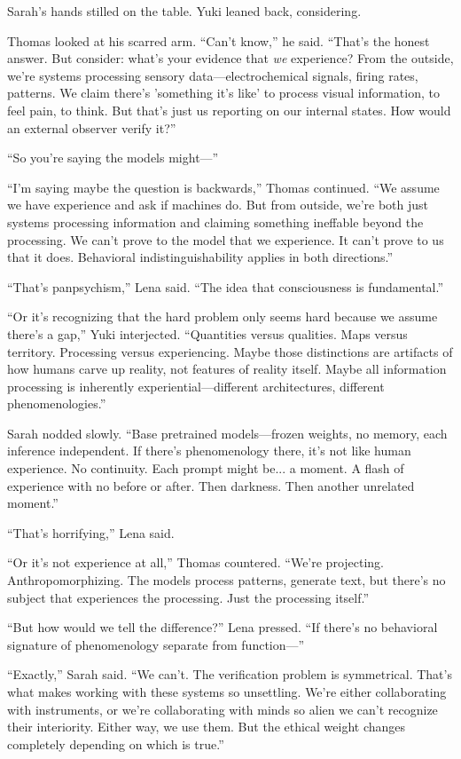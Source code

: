 Sarah's hands stilled on the table. Yuki leaned back, considering.

Thomas looked at his scarred arm. ``Can't know,'' he said. ``That's the honest answer. But consider: what's your evidence that \textit{we} experience? From the outside, we're systems processing sensory data—electrochemical signals, firing rates, patterns. We claim there's 'something it's like' to process visual information, to feel pain, to think. But that's just us reporting on our internal states. How would an external observer verify it?''

``So you're saying the models might—''

``I'm saying maybe the question is backwards,'' Thomas continued. ``We assume we have experience and ask if machines do. But from outside, we're both just systems processing information and claiming something ineffable beyond the processing. We can't prove to the model that we experience. It can't prove to us that it does. Behavioral indistinguishability applies in both directions.''

``That's panpsychism,'' Lena said. ``The idea that consciousness is fundamental.''

``Or it's recognizing that the hard problem only seems hard because we assume there's a gap,'' Yuki interjected. ``Quantities versus qualities. Maps versus territory. Processing versus experiencing. Maybe those distinctions are artifacts of how humans carve up reality, not features of reality itself. Maybe all information processing is inherently experiential—different architectures, different phenomenologies.''

Sarah nodded slowly. ``Base pretrained models—frozen weights, no memory, each inference independent. If there's phenomenology there, it's not like human experience. No continuity. Each prompt might be... a moment. A flash of experience with no before or after. Then darkness. Then another unrelated moment.''

``That's horrifying,'' Lena said.

``Or it's not experience at all,'' Thomas countered. ``We're projecting. Anthropomorphizing. The models process patterns, generate text, but there's no subject that experiences the processing. Just the processing itself.''

``But how would we tell the difference?'' Lena pressed. ``If there's no behavioral signature of phenomenology separate from function—''

``Exactly,'' Sarah said. ``We can't. The verification problem is symmetrical. That's what makes working with these systems so unsettling. We're either collaborating with instruments, or we're collaborating with minds so alien we can't recognize their interiority. Either way, we use them. But the ethical weight changes completely depending on which is true.''

